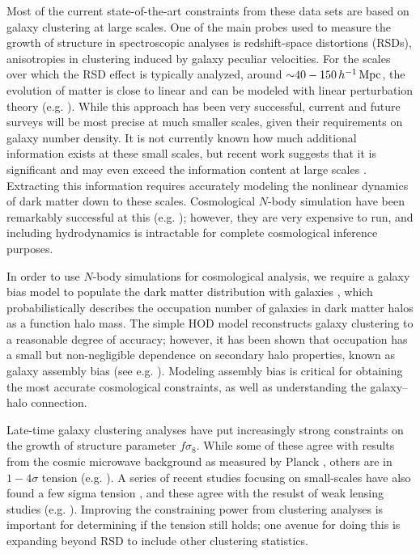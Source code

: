 Most of the current state-of-the-art constraints from these data sets are based on galaxy clustering at large scales.
One of the main probes used to measure the growth of structure in spectroscopic analyses is redshift-space distortions (RSDs), anisotropies in clustering induced by galaxy peculiar velocities.
For the scales over which the RSD effect is typically analyzed, around $\mathord{\sim}40-150 \, h^{-1}\,\mathrm{Mpc}$, the evolution of matter is close to linear and can be modeled with linear perturbation theory (e.g. \citealt{Alam2017}).
While this approach has been very successful, current and future surveys will be most precise at much smaller scales, given their requirements on galaxy number density.
It is not currently known how much additional information exists at these small scales, but recent work suggests that it is significant and may even exceed the information content at large scales \citep{Zhai2019}.
Extracting this information requires accurately modeling the nonlinear dynamics of dark matter down to these scales.
Cosmological $N$-body simulation have been remarkably successful at this (e.g. \citealt{Klypin2011}); however, they are very expensive to run, and including hydrodynamics is intractable for complete cosmological inference purposes.

In order to use $N$-body simulations for cosmological analysis, we require a galaxy bias model to populate the dark matter distribution with galaxies \citep{Seljak2000, BerlindWeinberg2002, CooraySheth2002, Zheng2005}, which probabilistically describes the occupation number of galaxies in dark matter halos as a function halo mass.
The simple HOD model reconstructs galaxy clustering to a reasonable degree of accuracy; however, it has been shown that occupation has a small but non-negligible dependence on secondary halo properties, known as galaxy assembly bias (see e.g. \citealt{Wechsler2006, Croton2007, Zentner2014, WechslerTinker2018}).
Modeling assembly bias is critical for obtaining the most accurate cosmological constraints, as well as understanding the galaxy--halo connection.

Late-time galaxy clustering analyses have put increasingly strong constraints on the growth of structure parameter $f \sigma_8$.
While some of these agree with results from the cosmic microwave background as measured by Planck \citep{eboss_collaboration_completed_2021,zhang_boss_2022}, others are in $1-4 \sigma$ tension (e.g. \citealt{Macaulay2013, Sanchez2014, deMattia2021}).
A series of recent studies focusing on small-scales have also found a few sigma tension \citep{Chapman2021, Lange2022, Zhai2022, Yuan2022}, and these agree with the resulst of weak lensing studies (e.g. \citealt{MacCrann2015, Leauthaud2017, joudaki_kidsviking-450_2020}).
Improving the constraining power from clustering analyses is important for determining if the tension still holds; one avenue for doing this is expanding beyond RSD to include other clustering statistics.

